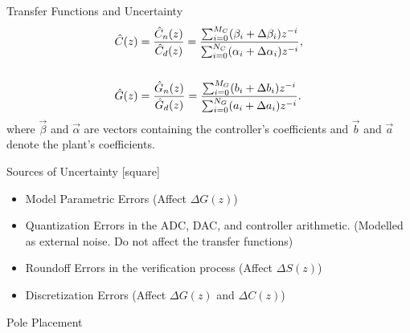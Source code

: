 \documentclass{beamer}
\begin{document}
\begin{frame}{Transfer Functions and Uncertainty}
\begin{align*}
\small
\label{controller_plant_tf}
\hat{C}(z)&=\frac{\hat{C}_n(z)}{\hat{C}_d(z)}=\frac{\sum_{i=0}^{M_C}(\beta_{i}+\Delta\beta_{i}) z^{-i}}{\sum_{i=0}^{N_C}(\alpha_{i}+\Delta \alpha_{i}) z^{-i}}, \\
\\%
\hat{G}(z)&=\frac{\hat{G}_n(z)}{\hat{G}_d(z)}=\frac{\sum_{i=0}^{M_G}(b_{i}+\Delta b_i) z^{-i}}{\sum_{i=0}^{N_G}(a_{i}+\Delta a_{i}) z^{-i}}.
\end{align*}
%
where $\vec{\beta}$ and $\vec{\alpha}$ are vectors containing the
controller's coefficients and $\vec{b}$ and $\vec{a}$ denote the
plant's coefficients. 

\end{frame}

\begin{frame}{Sources of Uncertainty}
[square]
\begin{itemize}
\item<1-> Model Parametric Errors (Affect $\Delta G(z)$)
\item<2-> Quantization Errors in the ADC, DAC, and controller arithmetic. 
(Modelled as external noise. Do not affect the transfer functions)
\item<3-> Roundoff Errors in the verification process (Affect $\Delta S(z)$)
\item<4-> Discretization Errors  (Affect $\Delta G(z)$ and $\Delta C(z)$)
\end{itemize}
\end{frame}

\begin{frame}[fragile]{Pole Placement}


\begin{figure}
\centering
{}
\end{figure}
\end{frame}
\end{document}
